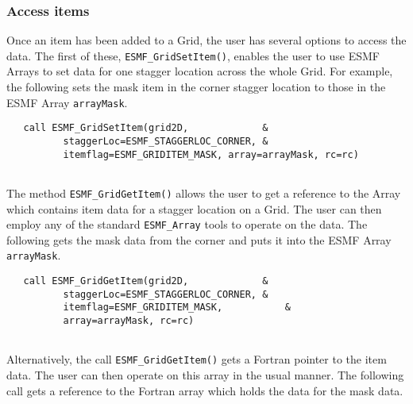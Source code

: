 
  \subsubsection{Access items}
  \label{sec:usage:items:accessing}
   \begin{sloppypar}
   Once an item has been added to a Grid, the user has several options to access
   the data. The first of these, {\tt ESMF\_GridSetItem()},
   enables the user to use ESMF Arrays to set data for one stagger location across the whole Grid.
   For example, the following sets the mask item in the corner stagger location to
   those in the ESMF Array {\tt arrayMask}.
   \end{sloppypar} 

 \begin{verbatim}
   call ESMF_GridSetItem(grid2D,             &
          staggerLoc=ESMF_STAGGERLOC_CORNER, &
          itemflag=ESMF_GRIDITEM_MASK, array=arrayMask, rc=rc)
 
\end{verbatim}
 

   The method {\tt ESMF\_GridGetItem()} allows the user
   to get a reference to the Array which
   contains item data for a stagger location on a Grid. The user
   can then employ any of the standard {\tt ESMF\_Array} tools to operate
   on the data. The following gets the mask data from the corner
   and puts it into the ESMF Array {\tt arrayMask}. 

 \begin{verbatim}
   call ESMF_GridGetItem(grid2D,             &
          staggerLoc=ESMF_STAGGERLOC_CORNER, &
          itemflag=ESMF_GRIDITEM_MASK,           &
          array=arrayMask, rc=rc)
 
\end{verbatim}
 

   Alternatively, the call {\tt ESMF\_GridGetItem()} gets a Fortran pointer to
   the item data. The user can then operate on this array in the usual
   manner. The following call gets a reference to the
   Fortran array which holds the data for the mask data. 

